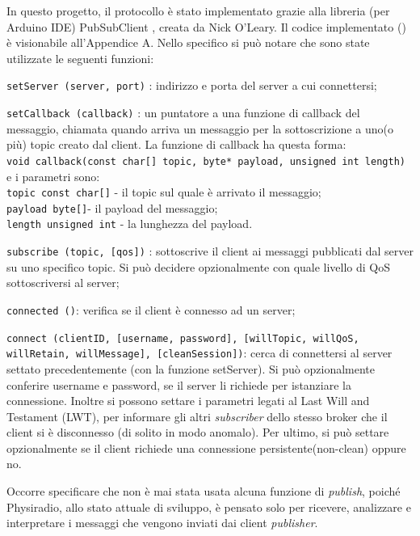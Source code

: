 \documentclass[12pt,a4paper]{report}
\newcommand{\physiradio}{Physiradio} %
\begin{document}
In questo progetto, il protocollo è stato implementato grazie alla libreria (per Arduino IDE) PubSubClient \cite{mqttPubSubClient}, creata da Nick O’Leary. Il codice implementato () è visionabile all'Appendice A. Nello specifico si può notare che sono state utilizzate le seguenti funzioni:
\begin{compactitem}
	\item \texttt{setServer (server, port)} : indirizzo e porta del server a cui connettersi;
	\item \texttt{setCallback (callback)} : un puntatore a una funzione di callback del messaggio, chiamata quando arriva un messaggio per la sottoscrizione a uno(o più) topic creato dal client. La funzione di callback ha questa forma: \\
	
	\texttt{void callback(const char[] topic, byte* payload, unsigned int length)}\\
	
	e i parametri sono:\\
	\texttt{topic const char[]} - il topic sul quale è arrivato il messaggio;\\
	\texttt{payload byte[]}- il payload del messaggio;\\
	\texttt{length unsigned int} - la lunghezza del payload.\\
	
	\item \texttt{subscribe (topic, [qos])} : sottoscrive il client ai messaggi pubblicati dal server su uno specifico topic. Si può decidere opzionalmente con quale livello di QoS sottoscriversi al server;
	\item \texttt{connected ()}: verifica se il client è connesso ad un server;
	\item \texttt{connect (clientID, [username, password], [willTopic, willQoS, willRetain, willMessage], [cleanSession])}: cerca di connettersi al server settato precedentemente (con la funzione setServer). Si può opzionalmente conferire username e password, se il server li richiede per istanziare la connessione. Inoltre si possono settare i parametri legati al Last Will and Testament (LWT), per informare gli altri \textit{subscriber} dello stesso broker che il client si è disconnesso (di solito in modo anomalo). Per ultimo, si può settare opzionalmente se il client richiede una connessione persistente(non-clean) oppure no.\\
\end{compactitem}
Occorre specificare che non è mai stata usata alcuna funzione di \textit{publish}, poiché \physiradio, allo stato attuale di sviluppo, è pensato solo per ricevere, analizzare e interpretare i messaggi che vengono inviati dai client \textit{publisher}. 
\end{document}
